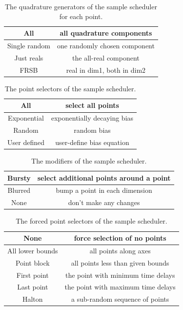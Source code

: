 \begin{table}[h]
  \begin{tabular}{ | c | c | }
    \hline
    All             &  all quadrature components        \\  \hline
    Single random   &  one randomly chosen component    \\  \hline
    Just reals      &  the all-real component           \\  \hline
    FRSB            &  real in dim1, both in dim2       \\  \hline
  \end{tabular}
  \caption{The quadrature generators of the sample scheduler for each point.}
  \label{scheduler_quadrature_generators}
\end{table}

\begin{table}[h]
  \begin{tabular}{ | c | c | }
    \hline
    All             &  select all points  \\  \hline
    Exponential     &  exponentially decaying bias  \\  \hline
    Random          &  random bias  \\  \hline
    User defined    &  user-define bias equation  \\  \hline
  \end{tabular}
  \caption{The point selectors of the sample scheduler.}
  \label{scheduler_point_selectors}
\end{table}

\begin{table}[h]
  \begin{tabular}{ | c | c | }
    \hline
    Bursty    &  select additional points around a point  \\  \hline
    Blurred   &  bump a point in each dimension   \\  \hline
    None      &  don't make any changes           \\  \hline
  \end{tabular}
  \caption{The modifiers of the sample scheduler.}
  \label{scheduler_modifiers}
\end{table}

\begin{table}[h]
  \begin{tabular}{ | c | c | }
    \hline
    None                &  force selection of no points         \\  \hline
    All lower bounds    &  all points along axes                \\  \hline
    Point block         &  all points less than given bounds    \\  \hline
    First point         &  the point with minimum time delays   \\  \hline
    Last point          &  the point with maximum time delays   \\  \hline
    Halton              &  a sub-random sequence of points      \\  \hline
  \end{tabular}
  \caption{The forced point selectors of the sample scheduler.}
  \label{scheduler_forced_point_selectors}
\end{table}

